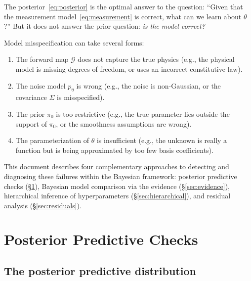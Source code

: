 \documentclass[11pt]{article}
\newcommand{\cG}{\mathcal{G}}
\theoremstyle{plain}
\theoremstyle{remark}
\theoremstyle{definition}
\begin{document}
The posterior~\eqref{eq:posterior} is the optimal answer to the question: 
``Given that the measurement model~\eqref{eq:measurement} is correct, what 
can we learn about $\theta$?'' But it does not answer the prior question: 
\emph{is the model correct?}

Model misspecification can take several forms:
\begin{enumerate}[label=(\roman*)]
\item The forward map $\cG$ does not capture the true physics (e.g., the 
  physical model is missing degrees of freedom, or uses an incorrect 
  constitutive law).
\item The noise model $p_\eta$ is wrong (e.g., the noise is non-Gaussian, 
  or the covariance $\Sigma$ is misspecified).
\item The prior $\pi_0$ is too restrictive (e.g., the true parameter lies 
  outside the support of $\pi_0$, or the smoothness assumptions are wrong).
\item The parameterization of $\theta$ is insufficient (e.g., the unknown 
  is really a function but is being approximated by too few basis coefficients).
\end{enumerate}

This document describes four complementary approaches to detecting and 
diagnosing these failures within the Bayesian framework:
posterior predictive checks (\S\ref{sec:ppc}), 
Bayesian model comparison via the evidence (\S\ref{sec:evidence}), 
hierarchical inference of hyperparameters (\S\ref{sec:hierarchical}), and 
residual analysis (\S\ref{sec:residuals}).

\section{Posterior Predictive Checks}\label{sec:ppc}

\subsection{The posterior predictive distribution}
\end{document}
